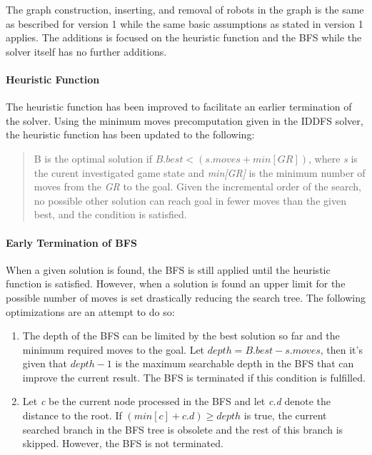 \documentclass[]{article}
\providecommand{\tightlist}{%
  \setlength{\itemsep}{0pt}\setlength{\parskip}{0pt}}
\let\oldparagraph\paragraph
\renewcommand{\paragraph}[1]{\oldparagraph{#1}\mbox{}}
\begin{document}
The graph construction, inserting, and removal of robots in the graph is
the same as bescribed for version 1 while the same basic assumptions as
stated in version 1 applies. The additions is focused on the heuristic
function and the BFS while the solver itself has no further additions.

\paragraph{Heuristic Function}\label{heuristic-function}

The heuristic function has been improved to facilitate an earlier
termination of the solver. Using the minimum moves precomputation given
in the IDDFS solver, the heuristic function has been updated to the
following:

\begin{quote}
B is the optimal solution if \(B.best < (s.moves + min[GR])\), where
\emph{s} is the curent investigated game state and \emph{min{[}GR{]}} is
the minimum number of moves from the \emph{GR} to the goal. Given the
incremental order of the search, no possible other solution can reach
goal in fewer moves than the given best, and the condition is satisfied.
\end{quote}

\paragraph{Early Termination of BFS}\label{early-termination-of-bfs}

When a given solution is found, the BFS is still applied until the
heuristic function is satisfied. However, when a solution is found an
upper limit for the possible number of moves is set drastically reducing
the search tree. The following optimizations are an attempt to do so:

\begin{enumerate}
\def\labelenumi{\arabic{enumi}.}
\tightlist
\item
  The depth of the BFS can be limited by the best solution so far and
  the minimum required moves to the goal. Let
  \(depth = B.best - s.moves\), then it's given that \(depth - 1\) is
  the maximum searchable depth in the BFS that can improve the current
  result. The BFS is terminated if this condition is fulfilled.
\item
  Let \emph{c} be the current node processed in the BFS and let
  \emph{c.d} denote the distance to the root. If
  \((min[c] + c.d) \geq depth\) is true, the current searched branch in
  the BFS tree is obsolete and the rest of this branch is skipped.
  However, the BFS is not terminated.
\end{enumerate}
\end{document}
